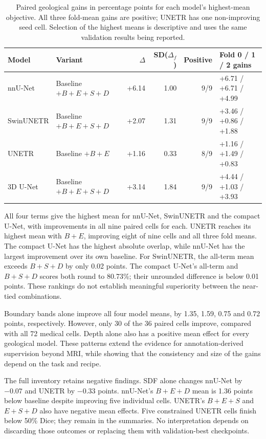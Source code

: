 \documentclass[12pt,a4paper]{article}
\begin{document}
\begin{table}[htbp]
\centering\footnotesize{}
\setlength{\tabcolsep}{5pt}
\begin{tabular}{@{}llrrrl@{}}
\hline
Model & Variant & $\Delta$ & SD($\Delta_f$) & Positive & Fold 0 / 1 / 2 gains \\
\hline
nnU-Net & Baseline $+B+E+S+D$ & +6.14 & 1.00 & 9/9 & +6.71 / +6.71 / +4.99 \\
SwinUNETR & Baseline $+B+E+S+D$ & +2.07 & 1.31 & 9/9 & +3.46 / +0.86 / +1.88 \\
UNETR & Baseline $+B+E$ & +1.16 & 0.33 & 8/9 & +1.16 / +1.49 / +0.83 \\
3D U-Net & Baseline $+B+E+S+D$ & +3.14 & 1.84 & 9/9 & +4.44 / +1.03 / +3.93 \\
\hline
\end{tabular}
\caption{Paired geological gains in percentage points for each model's
highest-mean objective. All three fold-mean gains are positive; UNETR
has one non-improving seed cell. Selection of the highest means is
descriptive and uses the same validation results being reported.}
\label{tab:geo-best}
\end{table}

All four terms give the highest mean for nnU-Net, SwinUNETR and the
compact U-Net, with improvements in all nine paired cells for each.
UNETR reaches its highest mean with $B+E$, improving eight of nine
cells and all three fold means. The compact U-Net has the highest
absolute overlap, while nnU-Net has the largest improvement over its
own baseline. For SwinUNETR, the all-term mean exceeds $B+S+D$ by
only 0.02 points. The compact U-Net's all-term and $B+S+D$ scores
both round to 80.73\%; their unrounded difference is below 0.01
points. These rankings do not establish meaningful superiority
between the near-tied combinations.

Boundary bands alone improve all four model means, by 1.35, 1.59,
0.75 and 0.72 points, respectively. However, only 30 of the 36 paired
cells improve, compared with all 72 medical cells. Depth alone also
has a positive mean effect for every geological model. These patterns
extend the evidence for annotation-derived supervision beyond MRI,
while showing that the consistency and size of the gains depend on
the task and recipe.

The full inventory retains negative findings. SDF alone changes
nnU-Net by $-0.07$ and UNETR by $-0.33$ points. nnU-Net's
$B+E+D$ mean is 1.36 points below baseline despite improving five
individual cells. UNETR's $B+E+S$ and $E+S+D$ also have negative
mean effects. Five constrained UNETR cells finish below 50\% Dice;
they remain in the summaries. No interpretation depends on discarding
those outcomes or replacing them with validation-best checkpoints.
\end{document}
